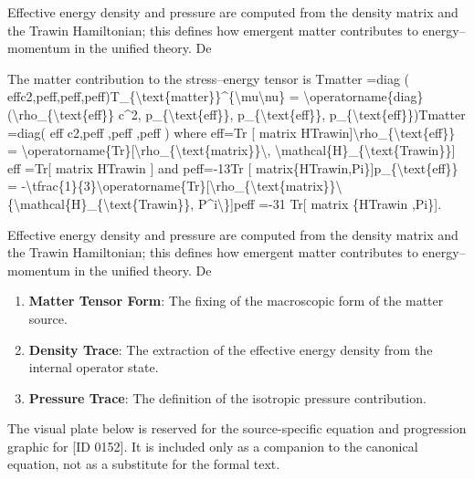 Effective energy density and pressure are computed from the density matrix and the Trawin Hamiltonian; this defines how emergent matter contributes to energy--momentum in the unified theory. De

The matter contribution to the stress--energy tensor is Tmatter  =diag ( effc2,peff,peff,peff)T\_\{\textbackslash{}text\{matter\}\}\textasciicircum{}\{\textbackslash{}mu\textbackslash{}nu\} = \textbackslash{}operatorname\{diag\}(\textbackslash{}rho\_\{\textbackslash{}text\{eff\}\} c\textasciicircum{}2, p\_\{\textbackslash{}text\{eff\}\}, p\_\{\textbackslash{}text\{eff\}\}, p\_\{\textbackslash{}text\{eff\}\})Tmatter   =diag( eff c2,peff ,peff ,peff ) where  eff=Tr [ matrix HTrawin]\textbackslash{}rho\_\{\textbackslash{}text\{eff\}\} = \textbackslash{}operatorname\{Tr\}[\textbackslash{}rho\_\{\textbackslash{}text\{matrix\}\}\textbackslash{}, \textbackslash{}mathcal\{H\}\_\{\textbackslash{}text\{Trawin\}\}] eff =Tr[ matrix HTrawin ] and peff=-13Tr [ matrix\{HTrawin,Pi\}]p\_\{\textbackslash{}text\{eff\}\} = -\textbackslash{}tfrac\{1\}\{3\}\textbackslash{}operatorname\{Tr\}[\textbackslash{}rho\_\{\textbackslash{}text\{matrix\}\}\textbackslash{}\{\textbackslash{}mathcal\{H\}\_\{\textbackslash{}text\{Trawin\}\}, P\textasciicircum{}i\textbackslash{}\}]peff =-31 Tr[ matrix \{HTrawin ,Pi\}].

Effective energy density and pressure are computed from the density matrix and the Trawin Hamiltonian; this defines how emergent matter contributes to energy--momentum in the unified theory. De
\endgroup

\begin{enumerate}[leftmargin=1.6em,itemsep=6pt,topsep=4pt]
\item \textbf{Matter Tensor Form}: The fixing of the macroscopic form of the matter source.
\item \textbf{Density Trace}: The extraction of the effective energy density from the internal operator state.
\item \textbf{Pressure Trace}: The definition of the isotropic pressure contribution.
\end{enumerate}

\begingroup\footnotesize\sloppy
The visual plate below is reserved for the source-specific equation and progression graphic for [ID 0152]. It is included only as a companion to the canonical equation, not as a substitute for the formal text.
\par\endgroup
\ifTZPDarkEdition
{}
\fi

